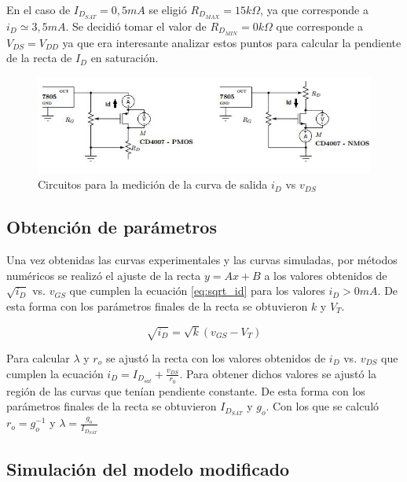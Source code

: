 \documentclass[10pt,spanish,a4paper,openany,notitlepage]{article}
\begin{document}
En el caso de $I_{D_{SAT}}=0,5 \unit{mA}$ se eligió $R_{D_{MAX}} = 15 \unit{k\Omega}$, ya que corresponde a $i_D \simeq 3,5 \unit{mA}$.
Se decidió tomar el valor de $R_{D_{MIN}}=0 \unit{k\Omega}$ que corresponde a $V_{DS}=V_{DD}$ ya que era interesante analizar estos puntos para calcular la pendiente de la recta de $I_D$ en saturación.


\begin{figure}[H] %
\begin{center}
\includegraphics[scale=0.7]{./Imagenes/banco_vd.jpg}
\caption{Circuitos para la medición de la curva de salida  $i_D$ vs $v_{DS}$}
 \label{fig:banco_vd}
\end{center}
\end{figure}

\subsection{Obtención de parámetros}

Una vez obtenidas las curvas experimentales y las curvas simuladas, por métodos numéricos se realizó el ajuste de la recta $y=Ax+B$ a los valores obtenidos de $\sqrt{i_D}$ vs. $v_{GS}$ que cumplen la ecuación \ref{eq:sqrt_id} para los valores $i_D > 0 \unit{mA}$. De esta forma con los parámetros finales de la recta se obtuvieron $k$ y $V_T$.

\begin{equation}
\sqrt{i_D}=\sqrt{k}(v_{GS}-V_T)
\label{eq:sqrt_id}
\end{equation}


Para calcular $\lambda$ y $r_o$ se ajustó la recta con los valores obtenidos de $i_D$ vs. $v_{DS}$ que cumplen la ecuación $i_D=I_{D_{sat}}+\frac{v_{DS}}{r_0}$. Para obtener dichos valores se ajustó la región de las curvas que tenían pendiente constante. De esta forma con los parámetros finales de la recta se obtuvieron $I_{D_{SAT}}$ y $g_o$. Con los que se calculó $r_o = g_o^{-1}$ y $\lambda = \frac{g_o}{I_{D_{SAT}}}$

\subsection{Simulación del modelo modificado}
\end{document}
